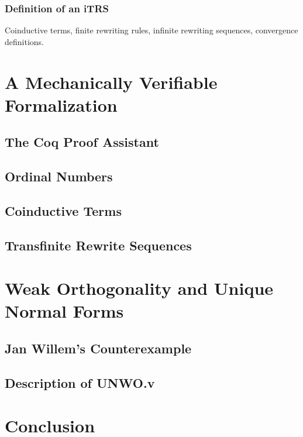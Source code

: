 \documentclass[11pt,oneside,a4paper,final]{report}
\theoremstyle{definition}
\begin{document}
\subsection{Definition of an iTRS}

Coinductive terms, finite rewriting rules, infinite rewriting sequences,
convergence definitions.


\chapter{A Mechanically Verifiable Formalization}\label{chap:formalization}


\section{The Coq Proof Assistant}


\section{Ordinal Numbers}


\section{Coinductive Terms}


\section{Transfinite Rewrite Sequences}


\chapter{Weak Orthogonality and Unique Normal Forms}\label{chap:unwo}


\section{Jan Willem's Counterexample}


\section{Description of UNWO.v}


\chapter{Conclusion}\label{chap:conclusion}


\pagebreak


\nocite{*}


\end{document}
